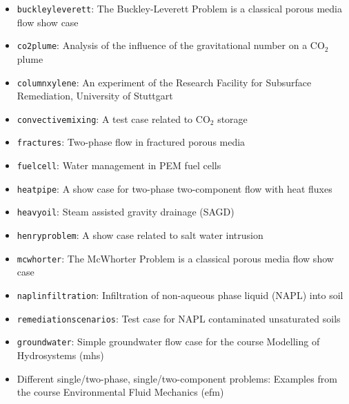 \begin{itemize}
\item \texttt{buckleyleverett}: The Buckley-Leverett Problem is a classical porous media flow show case
\item \texttt{co2plume}: Analysis of the influence of the gravitational number on a $\text{CO}_2$ plume
\item \texttt{columnxylene}: An experiment of the Research Facility for Subsurface Remediation, University of Stuttgart
\item \texttt{convectivemixing}: A test case related to CO$_2$ storage
\item \texttt{fractures}: Two-phase flow in fractured porous media
\item \texttt{fuelcell}: Water management in PEM fuel cells 
\item \texttt{heatpipe}: A show case for two-phase two-component flow with heat fluxes
\item \texttt{heavyoil}: Steam assisted gravity drainage (SAGD)
\item \texttt{henryproblem}: A show case related to salt water intrusion
\item \texttt{mcwhorter}: The McWhorter Problem is a classical porous media flow show case
\item \texttt{naplinfiltration}: Infiltration of non-aqueous phase liquid (NAPL) into soil
\item \texttt{remediationscenarios}: Test case for NAPL contaminated unsaturated soils
\item \texttt{groundwater}: Simple groundwater flow case for the course Modelling of Hydrosystems (mhs)
\item Different single/two-phase, single/two-component problems: Examples from the course Environmental Fluid Mechanics (efm)
\end{itemize}
